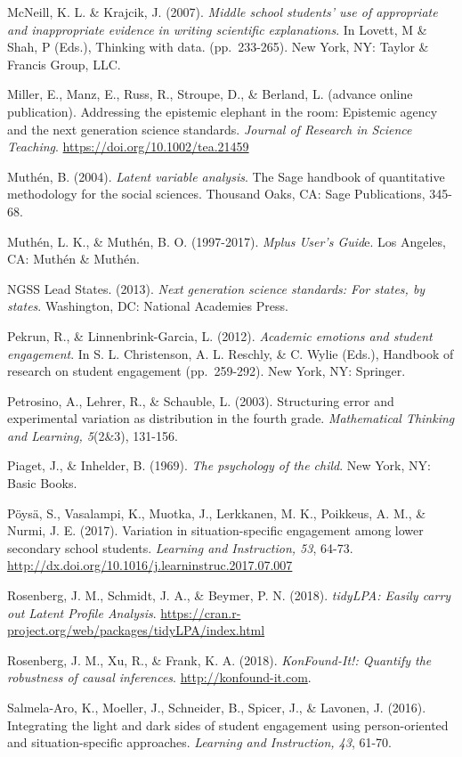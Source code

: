 \documentclass[]{msu-thesis}
\theoremstyle{definition}
\theoremstyle{definition}
\theoremstyle{definition}
\theoremstyle{remark}
\begin{document}
McNeill, K. L. \& Krajcik, J. (2007). \emph{Middle school students' use
of appropriate and inappropriate evidence in writing scientific
explanations}. In Lovett, M \& Shah, P (Eds.), Thinking with data.
(pp.~233-265). New York, NY: Taylor \& Francis Group, LLC.

Miller, E., Manz, E., Russ, R., Stroupe, D., \& Berland, L. (advance
online publication). Addressing the epistemic elephant in the room:
Epistemic agency and the next generation science standards.
\emph{Journal of Research in Science Teaching}.
\url{https://doi.org/10.1002/tea.21459}

Muthén, B. (2004). \emph{Latent variable analysis}. The Sage handbook of
quantitative methodology for the social sciences. Thousand Oaks, CA:
Sage Publications, 345-68.

Muthén, L. K., \& Muthén, B. O. (1997-2017). \emph{Mplus User's Guid}e.
Los Angeles, CA: Muthén \& Muthén.

NGSS Lead States. (2013). \emph{Next generation science standards: For
states, by states}. Washington, DC: National Academies Press.

Pekrun, R., \& Linnenbrink-Garcia, L. (2012). \emph{Academic emotions
and student engagement}. In S. L. Christenson, A. L. Reschly, \& C.
Wylie (Eds.), Handbook of research on student engagement (pp.~259-292).
New York, NY: Springer.

Petrosino, A., Lehrer, R., \& Schauble, L. (2003). Structuring error and
experimental variation as distribution in the fourth grade.
\emph{Mathematical Thinking and Learning, 5}(2\&3), 131-156.

Piaget, J., \& Inhelder, B. (1969). \emph{The psychology of the child}.
New York, NY: Basic Books.

Pöysä, S., Vasalampi, K., Muotka, J., Lerkkanen, M. K., Poikkeus, A. M.,
\& Nurmi, J. E. (2017). Variation in situation-specific engagement among
lower secondary school students. \emph{Learning and Instruction, 53},
64-73. \url{http://dx.doi.org/10.1016/j.learninstruc.2017.07.007}

Rosenberg, J. M., Schmidt, J. A., \& Beymer, P. N. (2018).
\emph{tidyLPA: Easily carry out Latent Profile Analysis}.
\url{https://cran.r-project.org/web/packages/tidyLPA/index.html}

Rosenberg, J. M., Xu, R., \& Frank, K. A. (2018). \emph{KonFound-It!:
Quantify the robustness of causal inferences}.
\url{http://konfound-it.com}.

Salmela-Aro, K., Moeller, J., Schneider, B., Spicer, J., \& Lavonen, J.
(2016). Integrating the light and dark sides of student engagement using
person-oriented and situation-specific approaches. \emph{Learning and
Instruction, 43}, 61-70.
\end{document}
